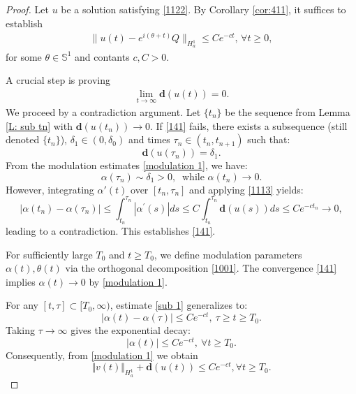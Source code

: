 \documentclass[12pt]{amsart}
\newcommand{\nha}{H^1_a}
\begin{document}
\begin{proof} Let $u$ be a solution satisfying \eqref{1122}. By Corollary \ref{cor:411}, it suffices to establish
\begin{align}\label{448}
\|u(t)-e^{i(\theta+t)}Q\|_{\nha}\le Ce^{-ct}, \, \forall t\ge 0,
\end{align}
for some $\theta\in \mathbb S^1$ and contants $c, C>0$. 

A crucial step is proving 
\begin{align}\label{141}
\lim_{t\to \infty}\mathbf{d}(u(t))=0.
\end{align} 
We proceed by a contradiction argument. Let $\{t_n\}$ be the sequence from Lemma \ref{L: sub tn} with $\mathbf{d}(u(t_n))\to 0$. If \eqref{141} fails, there exists a subsequence (still denoted $\{t_n\}$), 
$\delta _{1}\in (0,\delta _{0})$ and times $\tau_n\in(t_n, t_{n+1})$ such that:
\begin{equation*}
\mathbf{d}(u(\tau _{n}))=\delta _{1}.
\end{equation*}%
From the modulation estimates \eqref{modulation 1}, we have:
\[
\alpha(\tau _{n})\sim \delta_1>0,\ \text{ while } \alpha(t _{n})\to 0.
\]
However, integrating $\alpha'(t)$ over $[t_n,\tau_n]$ and applying \eqref{1113} yields:
\begin{equation}
|\alpha (t_{n})-\alpha (\tau _{n})|\leq \int_{t_{n}}^{\tau _{n}}|\alpha
^{\prime }(s)|ds\leq C\int_{t_{n}}^{\tau _{n}}\mathbf{d}(u(s))ds\leq
Ce^{-ct_{n}}\to 0, \label{sub 1}
\end{equation}%
leading to a contradiction. This establishes \eqref{141}. 

For sufficiently large $T_0$ and $t\ge T_0$, we define modulation parameters $\alpha(t), \theta(t)$ via the orthogonal decomposition \eqref{1001}. The convergence \eqref{141} implies $\alpha(t)\to 0$ by \eqref{modulation 1}. 

For any $[t,\tau]\subset[T_0, \infty)$, estimate \eqref{sub 1} generalizes to: 
\begin{equation*}
|\alpha (t)-\alpha (\tau )|\leq Ce^{-ct},\ \tau \geq t\geq T_{0}.
\end{equation*}%
Taking $\tau\to \infty$ gives the exponential decay: 
\begin{equation}
|\alpha (t)|\leq Ce^{-ct},\ \forall t\geq T_{0}.\label{251}
\end{equation}%
 Consequently, from \eqref{modulation 1} we obtain 
\begin{equation}
\Vert v(t)\Vert _{H_{a}^{1}}+\mathbf{d}(u(t))\leq Ce^{-ct},\forall t\geq
T_{0}.  \label{sub 2}
\end{equation}%


\end{proof}
\end{document}
